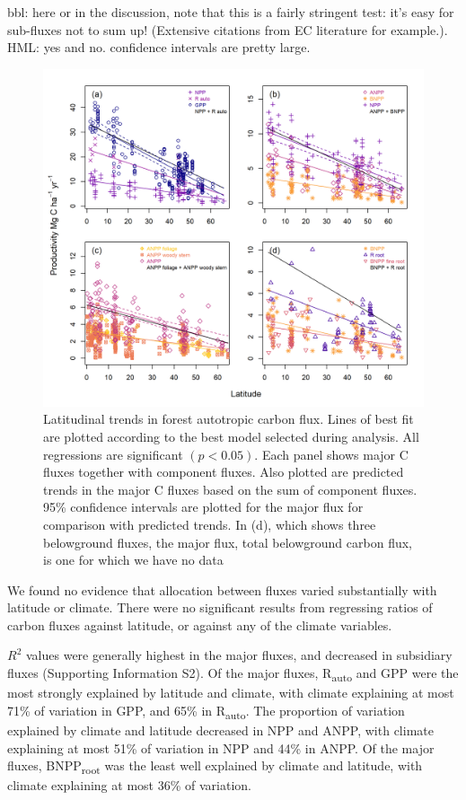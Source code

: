 \documentclass[]{article}
\begin{document}
bbl: here or in the discussion, note that this is a fairly stringent
test: it's easy for sub-fluxes not to sum up! (Extensive citations from
EC literature for example.). HML: yes and no. confidence intervals are
pretty large.

\begin{figure}[H]
\includegraphics[width=1\linewidth]{combined_stacked} \caption{Latitudinal trends in forest autotropic carbon flux. Lines of best fit are plotted according to the best model selected during analysis. All regressions are significant $(p<0.05)$. Each panel shows major C fluxes together with component fluxes. Also plotted are predicted trends in the major C fluxes based on the sum of component fluxes. 95\% confidence intervals are plotted for the major flux for comparison with predicted trends. In (d),  which shows three belowground fluxes, the major flux, total belowground carbon flux, is one for which we have no data}\label{fig:unnamed-chunk-6}
\end{figure}

We found no evidence that allocation between fluxes varied substantially
with latitude or climate. There were no significant results from
regressing ratios of carbon fluxes against latitude, or against any of
the climate variables.

\(R^2\) values were generally highest in the major fluxes, and decreased
in subsidiary fluxes (Supporting Information S2). Of the major fluxes,
R\textsubscript{auto} and GPP were the most strongly explained by
latitude and climate, with climate explaining at most 71\% of variation
in GPP, and 65\% in R\textsubscript{auto}. The proportion of variation
explained by climate and latitude decreased in NPP and ANPP, with
climate explaining at most 51\% of variation in NPP and 44\% in ANPP. Of
the major fluxes, BNPP\textsubscript{root} was the least well explained
by climate and latitude, with climate explaining at most 36\% of
variation.
\end{document}

